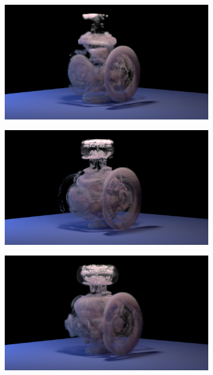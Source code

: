 \documentclass[11pt]{article}
\begin{document}
\begin{figure}
\begin{subfigure}[h]{0.5\textwidth}
	\end{subfigure}
	\begin{subfigure}[h]{0.5\textwidth}
		\centering
		\includegraphics[width=\textwidth]{Figures/renders/plume0011.png}
	\end{subfigure}
	\begin{subfigure}[h]{0.5\textwidth}
		\centering
		\includegraphics[width=\textwidth]{Figures/renders/plume0012.png}
	\end{subfigure}
	\begin{subfigure}[h]{0.5\textwidth}
		\centering
		\includegraphics[width=\textwidth]{Figures/renders/plume0013.png}

\end{subfigure}
\end{figure}
\end{document}
